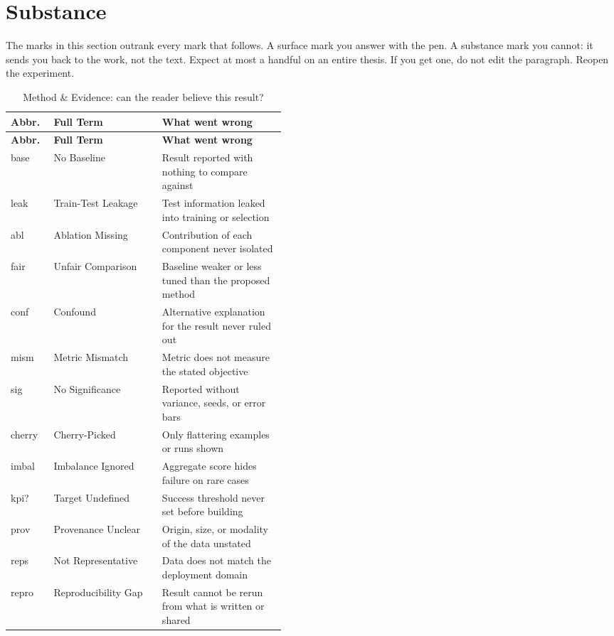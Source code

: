 \documentclass{../sharedAssets/tufte}
\begin{document}
\section{Substance}
 The marks in this section outrank every mark that
follows. A surface mark you answer with the pen. A substance mark you cannot: it sends
you back to the work, not the text. Expect at most a handful on an entire thesis. If you
get one, do not edit the paragraph. Reopen the experiment.

\setlength\LTleft{0pt}
\setlength\LTright{0pt}

\begin{longtable}{@{\extracolsep{\fill}}llp{0.45\linewidth}}
  \caption{Method \& Evidence: can the reader believe this result?}\\
  \toprule
  \textbf{Abbr.} & \textbf{Full Term} & \textbf{What went wrong} \\
  \midrule
  \endfirsthead
  \toprule
  \textbf{Abbr.} & \textbf{Full Term} & \textbf{What went wrong} \\
  \midrule
  \endhead
  \bottomrule
  \endlastfoot
  base   & No Baseline         & Result reported with nothing to compare against \\
  leak   & Train-Test Leakage  & Test information leaked into training or selection \\
  abl    & Ablation Missing    & Contribution of each component never isolated \\
  fair   & Unfair Comparison   & Baseline weaker or less tuned than the proposed method \\
  conf   & Confound            & Alternative explanation for the result never ruled out \\
  mism   & Metric Mismatch     & Metric does not measure the stated objective \\
  sig    & No Significance     & Reported without variance, seeds, or error bars \\
  cherry & Cherry-Picked       & Only flattering examples or runs shown \\
  imbal  & Imbalance Ignored   & Aggregate score hides failure on rare cases \\
  kpi?   & Target Undefined    & Success threshold never set before building \\
  prov   & Provenance Unclear  & Origin, size, or modality of the data unstated \\
  reps   & Not Representative  & Data does not match the deployment domain \\
  repro  & Reproducibility Gap & Result cannot be rerun from what is written or shared \\
\end{longtable}
\end{document}
